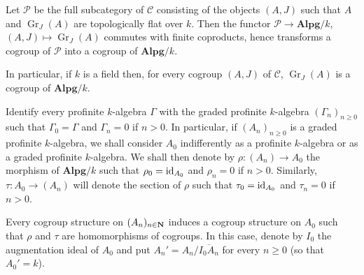 \begin{corollary}{}
Let $\mathscr P$ be the full subcategory of $\mathscr C$ consisting of the objects $(A,J)$ such that $A$ and $\operatorname{Gr}_J(A)$ are topologically flat over $k$. Then the functor $\mathscr P\to\mathbf{Alpg}/k$, $(A,J)\mapsto\operatorname{Gr}_J(A)$ commutes with finite coproducts, hence transforms a cogroup of $\mathscr P$ into a cogroup of $\mathbf{Alpg}/k$.

In particular, if $k$ is a field then, for every cogroup $(A,J)$ of $\mathscr C$, $\operatorname{Gr}_J(A)$ is a cogroup of $\mathbf{Alpg}/k$.
\end{corollary}

Identify every profinite $k$-algebra $\Gamma$ with the graded profinite $k$-algebra $(\Gamma_n)_{n\ge0}$ such that $\Gamma_0=\Gamma$ and $\Gamma_n=0$ if $n>0$. In particular, if $(A_n)_{n\ge0}$ is a graded profinite $k$-algebra, we shall consider $A_0$ indifferently as a profinite $k$-algebra or as a graded profinite $k$-algebra. We shall then denote by $\rho:(A_n)\to A_0$ the morphism of $\mathbf{Alpg}/k$ such that $\rho_0=\mathrm{id}_{A_0}$ and $\rho_n=0$ if $n>0$. Similarly, $\tau:A_0\to(A_n)$ will denote the section of $\rho$ such that $\tau_0=\mathrm{id}_{A_0}$ and $\tau_n=0$ if $n>0$.

Every cogroup structure on $(A_n)_{n\in\mathbf{N}}$ induces a cogroup structure on $A_0$ such that $\rho$ and $\tau$ are homomorphisms of cogroups. In this case, denote by $I_0$ the augmentation ideal of $A_0$ and put $A_n'=A_n/\overline{I_0A_n}$ for every $n\ge0$ (so that $A_0'=k$).

